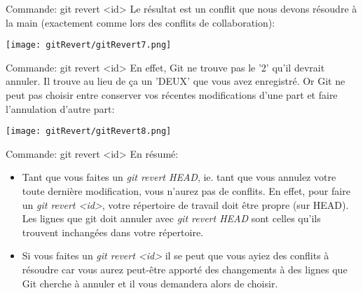 \documentclass{beamer}
\begin{document}
\begin{frame}{Commande: git revert <id>}
Le résultat est un conflit que nous devons résoudre à la main (exactement comme lors des conflits de collaboration):
\begin{center}
	\texttt{[image: gitRevert/gitRevert7.png]}
\end{center}
\end{frame}

\begin{frame}{Commande: git revert <id>}
En effet, Git ne trouve pas le '2' qu'il devrait annuler. Il trouve au lieu de ça un 'DEUX' que vous avez enregistré. Or Git ne peut pas choisir entre conserver vos récentes modifications d'une part et faire l'annulation d'autre part:
\begin{center}
	\texttt{[image: gitRevert/gitRevert8.png]}
\end{center}
\end{frame}

\begin{frame}{Commande: git revert <id>}
En résumé:
\begin{itemize}
	\item Tant que vous faites un \textit{git revert HEAD}, ie. tant que vous annulez votre toute dernière modification, vous n'aurez pas de conflits. En effet, pour faire un \textit{git revert <id>}, votre répertoire de travail doit être propre (sur HEAD). Les lignes que git doit annuler avec \textit{git revert HEAD} sont celles qu'ils trouvent inchangées dans votre répertoire.
	\item Si vous faites un \textit{git revert <id>} il se peut que vous ayiez des conflits à résoudre car vous aurez peut-être apporté des changements à des lignes que Git cherche à annuler et il vous demandera alors de choisir.
\end{itemize}
\end{frame}
\end{document}
